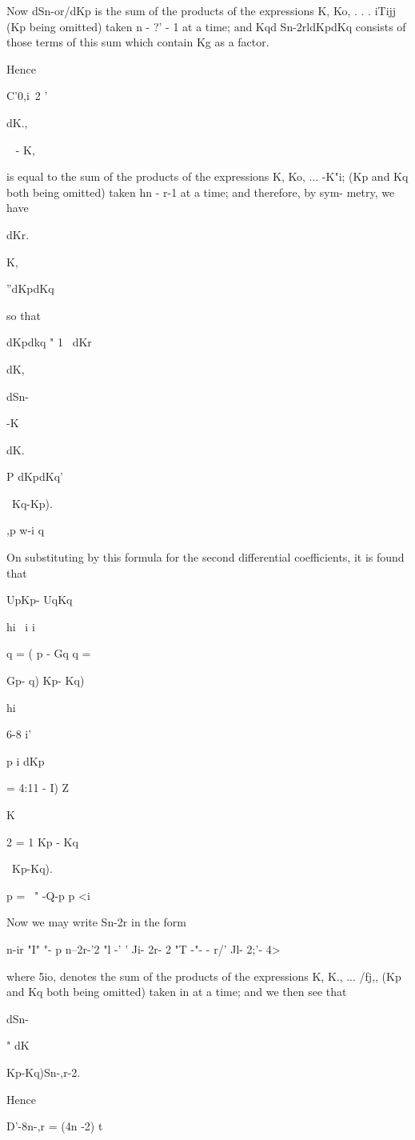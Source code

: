 {%

Now dSn-or/dKp is the sum of the products of the expressions K, Ko, .
. . iTijj (Kp being omitted) taken n - ?' - 1 at a time; and Kqd
Sn-2rldKpdKq consists of those terms of this sum which contain Kg as a
factor.

Hence

C'0,i\ 2 '

dK.,

~ - K,

is equal to the sum of the products of the expressions K, Ko, ...
-K"i; (Kp and Kq both being omitted) taken hn - r-1 at a time; and
therefore, by sym- metry, we have

dKr.

K,

''dKpdKq

so that

dKpdkq " 1 ~dKr

dK,

dSn-

-K

dK.

P dKpdKq'

\ Kq-Kp).

,p w-i q

On substituting by this formula for the second differential
coefficients, it is found that

UpKp- UqKq

hi \ i i

  q = ( p - Gq q = \ \ {Gp- q) Kp- Kq)\

hi

6-8 i'

p i dKp

= 4:11 - I) Z

K

2 = 1 Kp - Kq\

\ Kp-Kq).

p = \ " -Q-p p <i

Now we may write Sn-2r in the form

 n-ir "I" "- p n--2r-'2 "l -' ' Ji- 2r- 2 "T -"- - r/' Jl- 2;'- 4>

where 5io, denotes the sum of the products of the expressions K, K.,
... /fj,, (Kp and Kq both being omitted) taken in at a time; and we
then see that

dSn-

" dK

 Kp-Kq)Sn-,r-2.

Hence

D'-8n-,r = (4n -2) t

}}
